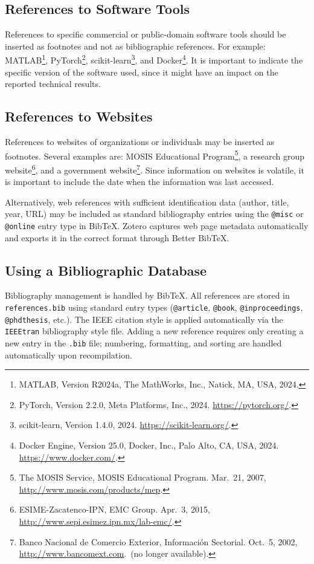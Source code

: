 \documentclass{iteso-irr}
\begin{document}
\subsection{References to Software Tools}
\label{sec:software_refs}

References to specific commercial or public-domain software tools should
be inserted as footnotes and not as bibliographic references. For
example:
MATLAB\footnote{MATLAB, Version R2024a, The MathWorks, Inc., Natick,
MA, USA, 2024.},
PyTorch\footnote{PyTorch, Version 2.2.0, Meta Platforms, Inc., 2024.
\url{https://pytorch.org/}.},
scikit-learn\footnote{scikit-learn, Version 1.4.0, 2024.
\url{https://scikit-learn.org/}.},
and
Docker\footnote{Docker Engine, Version 25.0, Docker, Inc., Palo Alto,
CA, USA, 2024. \url{https://www.docker.com/}.}.
It is important to indicate the specific version of the software used,
since it might have an impact on the reported technical results.

\subsection{References to Websites}
\label{sec:website_refs}

References to websites of organizations or individuals may be inserted
as footnotes. Several examples are: MOSIS Educational
Program\footnote{The MOSIS Service, MOSIS Educational Program.
Mar.~21, 2007, \url{http://www.mosis.com/products/mep}.}, a research
group website\footnote{ESIME-Zacatenco-IPN, EMC Group. Apr.~3, 2015,
\url{http://www.sepi.esimez.ipn.mx/lab-emc/}.}, and a government
website\footnote{Banco Nacional de Comercio Exterior,
Informaci\'{o}n Sectorial. Oct.~5, 2002,
\url{http://www.bancomext.com}.~(no longer available).}. Since
information on websites is volatile, it is important to include the
date when the information was last accessed.

Alternatively, web references with sufficient identification data (author,
title, year, URL) may be included as standard bibliography entries using
the \texttt{@misc} or \texttt{@online} entry type in BibTeX. Zotero
captures web page metadata automatically and exports it in the correct
format through Better BibTeX.

\subsection{Using a Bibliographic Database}
\label{sec:bibdb}

Bibliography management is handled by BibTeX. All references are stored
in \texttt{references.bib} using standard entry types (\texttt{@article},
\texttt{@book}, \texttt{@inproceedings}, \texttt{@phdthesis}, etc.). The
IEEE citation style is applied automatically via the \texttt{IEEEtran}
bibliography style file. Adding a new reference requires only creating a
new entry in the \texttt{.bib} file; numbering, formatting, and sorting
are handled automatically upon recompilation.
\end{document}
